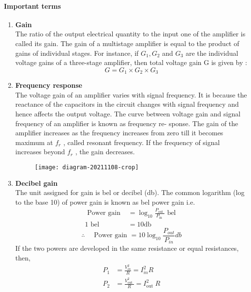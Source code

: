  \paragraph{Important terms}
 \begin{enumerate}
 	\item \textbf{Gain}\\
  The ratio of the output electrical quantity to the input one of the amplifier is called its gain.
  The gain of a multistage amplifier is equal to the product of gains of individual stages. For instance, if $G_{1}, G_{2}$ and $G_{3}$ are the individual voltage gains of a three-stage amplifier, then total voltage gain $\mathrm{G}$ is given by :
  $$
  G=G_{1} \times G_{2} \times G_{3}
  $$
  \item \textbf{Frequency response}	\\
  The voltage gain of an amplifier varies with signal frequency. It is because the reactance of the capacitors in the circuit changes with signal frequency and hence affects the output voltage. The curve between voltage gain and signal
  frequency of an amplifier is known as frequency re-
  sponse. The gain of the amplifier increases as the frequency increases from zero till it becomes maximum at $f_r$ , called resonant frequency. If the frequency of signal increases beyond $f_r$ , the gain decreases.\\
  \begin{figure}[H]
  	\centering
  	\texttt{[image: diagram-20211108-crop]}
  	\caption{}
  	\label{}
  \end{figure}
 \item  \textbf{Decibel gain}\\
 The unit assigned for gain is bel or decibel (db).
 The common logarithm (log to the base 10) of power gain is known as bel power gain i.e.
 $$
 \begin{aligned}
 \text { Power gain } &=\log _{10} \frac{P_{\text {out }}}{P_{\text {in }}} \text { bel } \\
 1 \text { bel } &=10 \mathrm{db}
 \end{aligned}
 $$
 $$
 \therefore \quad \text { Power gain }=10 \log _{10} \frac{P_{o u t}}{P_{i n}} d b
 $$
 If the two powers are developed in the same resistance or equal resistances, then,
 $$
 \begin{aligned}
 P_{1} &=\frac{V_{i n}^{2}}{R}=I_{i n}^{2} R \\
 P_{2} &=\frac{V_{\text {out }}^{2}}{R}=I_{\text {out }}^{2} R \\

\end{aligned}$$
\end{enumerate}
